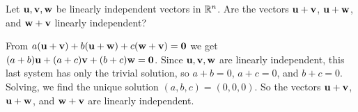 \begin{enumialphparenastyle}
\begin{ex}
  Let $\mbox{\bf u},\mbox{\bf v},\mbox{\bf w}$ be linearly independent vectors in
  $\mathbb{R}^n$. Are the vectors $\mbox{\bf u}+\mbox{\bf v}$, $\mbox{\bf u}+\mbox{\bf w}$,
  and $\mbox{\bf w}+\mbox{\bf v}$ linearly independent?
  \begin{sol}
    From
    $a(\mbox{\bf u}+\mbox{\bf v}) + b(\mbox{\bf u}+\mbox{\bf w}) +
    c(\mbox{\bf w}+\mbox{\bf v})=\mbox{\bf 0}$ we get
    $(a+b)\mbox{\bf u} + (a+c)\mbox{\bf v} + (b+c)\mbox{\bf w}=\mbox{\bf 0}$.  Since
    $\mbox{\bf u},\mbox{\bf v},\mbox{\bf w}$ are linearly independent, this last
    system has only the trivial solution, so $a+b=0$, $a+c=0$, and
    $b+c=0$. Solving, we find the unique solution
    $(a,b,c)=(0,0,0)$. So the vectors $\mbox{\bf u}+\mbox{\bf v}$,
    $\mbox{\bf u}+\mbox{\bf w}$, and $\mbox{\bf w}+\mbox{\bf v}$ are linearly
    independent.
  \end{sol}
\end{ex}

\end{enumialphparenastyle}
